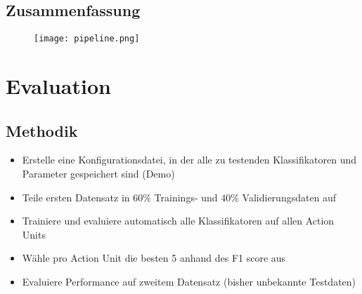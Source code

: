 \documentclass{beamer}
\begin{document}

\subsection{Zusammenfassung}
\begin{frame}[plain]
  \begin{figure}
    \texttt{[image: pipeline.png]}
  \end{figure}
\end{frame}

\section{Evaluation}
\subsection{Methodik}
\begin{frame}
  \begin{itemize}
  \item Erstelle eine Konfigurationsdatei, in der alle zu testenden
    Klassifikatoren und Parameter gespeichert sind (Demo)
  \item Teile ersten Datensatz in $60\%$ Trainings- und $40\%$ Validierungsdaten auf
    \item Trainiere und evaluiere automatisch alle Klassifikatoren auf allen
      Action Units
    \item Wähle pro Action Unit die besten 5 anhand des F1 score aus
    \item Evaluiere Performance auf zweitem Datensatz (bisher unbekannte Testdaten)
  \end{itemize}
\end{frame}
\end{document}
